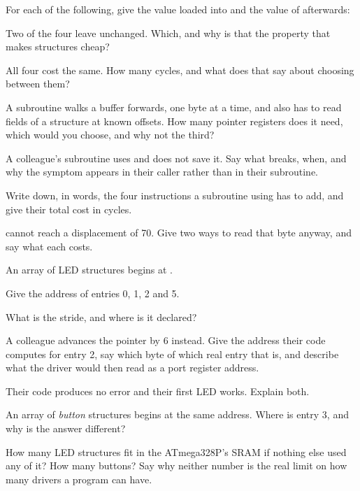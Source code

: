 For each of the following, give the value loaded into  and the value of 
afterwards:
\begin{parts}
  \item {}
  \item {}
  \item {}
  \item {}
  \item Two of the four leave  unchanged. Which, and why is that the property that makes
    structures cheap?
  \item All four cost the same. How many cycles, and what does that say about choosing between
    them?
\end{parts}

\label{c4:ex:which}
\begin{parts}
  \item A subroutine walks a buffer forwards, one byte at a time, and also has to read fields of a
    structure at known offsets. How many pointer registers does it need, which would you choose,
    and why not the third?
  \item A colleague's subroutine uses  and does not save it. Say what breaks, when, and why
    the symptom appears in their caller rather than in their subroutine.
  \item Write down, in words, the four instructions a subroutine using  has to add, and
    give their total cost in cycles.
  \item {} cannot reach a displacement of 70. Give two ways to read that byte anyway, and
    say what each costs.
\end{parts}

\label{c4:ex:arrays}
An array of LED structures begins at .
\begin{parts}
  \item Give the address of entries 0, 1, 2 and 5.
  \item What is the stride, and where is it declared?
  \item A colleague advances the pointer by 6 instead. Give the address their code computes for
    entry 2, say which byte of which real entry that is, and describe what the driver would then
    read as a port register address.
  \item Their code produces no error and their first LED works. Explain both.
  \item An array of \emph{button} structures begins at the same address. Where is entry 3, and why
    is the answer different?
  \item How many LED structures fit in the ATmega328P's SRAM if nothing else used any of it? How
    many buttons? Say why neither number is the real limit on how many drivers a program can have.
\end{parts}


